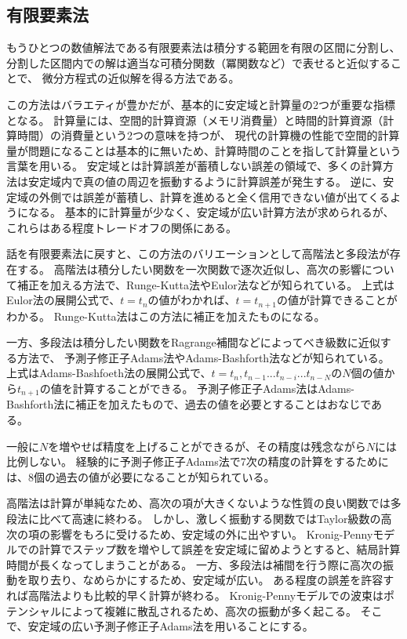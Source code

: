 \documentclass[autodetect-engine,dvipdfmx-if-dvi,ja=standard,a4paper,layout=v2]{bxjsreport}
\begin{document}
    \subsection{有限要素法}
    もうひとつの数値解法である有限要素法は積分する範囲を有限の区間に分割し、
    分割した区間内での解は適当な可積分関数（冪関数など）で表せると近似することで、
    微分方程式の近似解を得る方法である。\par
    この方法はバラエティが豊かだが、基本的に安定域と計算量の2つが重要な指標となる。
    計算量には、空間的計算資源（メモリ消費量）と時間的計算資源（計算時間）の消費量という2つの意味を持つが、
    現代の計算機の性能で空間的計算量が問題になることは基本的に無いため、計算時間のことを指して計算量という言葉を用いる。
    安定域とは計算誤差が蓄積しない誤差の領域で、多くの計算方法は安定域内で真の値の周辺を振動するように計算誤差が発生する。
    逆に、安定域の外側では誤差が蓄積し、計算を進めると全く信用できない値が出てくるようになる。
    基本的に計算量が少なく、安定域が広い計算方法が求められるが、これらはある程度トレードオフの関係にある。\par
    話を有限要素法に戻すと、この方法のバリエーションとして高階法と多段法が存在する。
    高階法は積分したい関数を一次関数で逐次近似し、高次の影響について補正を加える方法で、Runge-Kutta法やEulor法などが知られている。
    上式はEulor法の展開公式で、$t=t_n$の値がわかれば、$t=t_{n+1}$の値が計算できることがわかる。
    Runge-Kutta法はこの方法に補正を加えたものになる。\par
    一方、多段法は積分したい関数をRagrange補間などによってべき級数に近似する方法で、
    予測子修正子Adams法やAdams-Bashforth法などが知られている。
    上式はAdams-Bashfoeth法の展開公式で、$t=t_n,t_{n-1}...t_{n-i}...t_{n-N}$の$N$個の値から$t_{n+1}$の値を計算することができる。
    予測子修正子Adams法はAdams-Bashforth法に補正を加えたもので、過去の値を必要とすることはおなじである。\par
    一般に$N$を増やせば精度を上げることができるが、その精度は残念ながら$N$には比例しない。
    経験的に予測子修正子Adams法で7次の精度の計算をするためには、8個の過去の値が必要になることが知られている。\par
    高階法は計算が単純なため、高次の項が大きくないような性質の良い関数では多段法に比べて高速に終わる。
    しかし、激しく振動する関数ではTaylor級数の高次の項の影響をもろに受けるため、安定域の外に出やすい。
    Kronig-Pennyモデルでの計算でステップ数を増やして誤差を安定域に留めようとすると、結局計算時間が長くなってしまうことがある。
    一方、多段法は補間を行う際に高次の振動を取り去り、なめらかにするため、安定域が広い。
    ある程度の誤差を許容すれば高階法よりも比較的早く計算が終わる。
    Kronig-Pennyモデルでの波束はポテンシャルによって複雑に散乱されるため、高次の振動が多く起こる。
    そこで、安定域の広い予測子修正子Adams法を用いることにする。
\end{document}
